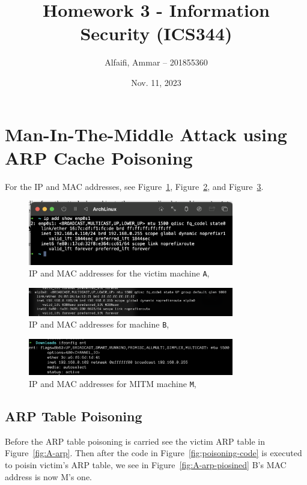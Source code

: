 \documentclass{article}
\title{Homework 3 - Information Security (ICS344)}
\author{Alfaifi, Ammar -- 201855360}
\date{Nov. 11, 2023}
\def\c#1{\texttt{#1}}
\begin{document}
\maketitle

\section{Man-In-The-Middle Attack using ARP Cache Poisoning} %
\label{sec:setup}
For the IP and MAC addresses, see Figure~\ref{fig:A-ip}, Figure~\ref{fig:B-ip}, and Figure~\ref{fig:M-ip}.

\begin{figure}[!hb]
	\centering
	\includegraphics[width=0.8\textwidth]{figures/A-ip.png}
	\caption{IP and MAC addresses for the victim machine \c{A}, }
	\label{fig:A-ip}
\end{figure}

\begin{figure}[!hb]
	\centering
	\includegraphics[width=0.8\textwidth]{figures/B-ip.png}
	\caption{IP and MAC addresses for machine \c{B}, }
	\label{fig:B-ip}
\end{figure}

\begin{figure}[!hb]
	\centering
	\includegraphics[width=0.8\textwidth]{figures/M-ip.png}
	\caption{IP and MAC addresses for MITM machine \c{M}, }
	\label{fig:M-ip}
\end{figure}

\subsection{ARP Table Poisoning} %
\label{sub:ARP Table Poisoning}
Before the ARP table poisoning is carried see the victim ARP table in Figure~\ref{fig:A-arp}. Then after the code in Figure~\ref{fig:poisoning-code} is executed to poisin victim's ARP table, we see in Figure~\ref{fig:A-arp-piosined} B's MAC address is now M's one.
\end{document}
